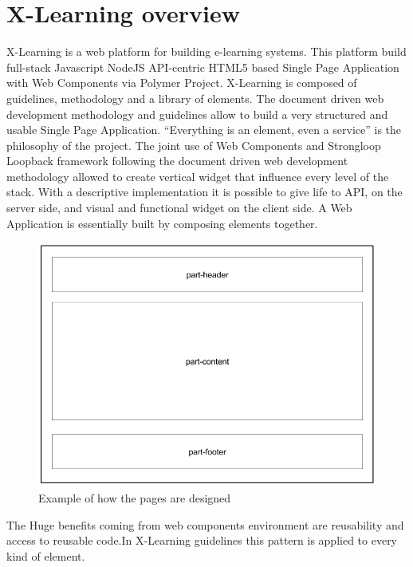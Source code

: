 \section{X-Learning overview}
\label{sec:x_learning_overview}

X-Learning is a web platform for building e-learning systems. This platform build full-stack Javascript NodeJS API-centric HTML5 based Single Page Application with Web Components via Polymer Project. X-Learning is composed of guidelines, methodology and a library of elements. The document driven web development methodology and guidelines allow to build a very structured and usable Single Page Application. 
“Everything is an element, even a service” is the philosophy of the project. The joint use of Web Components and Strongloop Loopback framework following the document driven web development methodology allowed to create vertical widget that influence every level of the stack. With a descriptive implementation it is possible to give life to API, on the server side, and visual and functional widget on the client side. A Web Application is essentially built by composing elements together.

\begin{figure}[htb]
 \centering
 \includegraphics[width=1.0\linewidth]{images/chapter4/design-page.png}\hfill
 \caption[Design page]{Example of how the pages are designed}
 \label{fig:design_page}
\end{figure}

The Huge benefits coming from web components environment are reusability and access to reusable code.In X-Learning guidelines this pattern is applied to every kind of element.